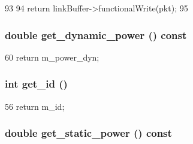 \begin{DoxyCode}
93 {
94     return linkBuffer->functionalWrite(pkt);
95 }
\end{DoxyCode}
\hypertarget{classNetworkLink__d_a10bdb0a8b5af73052370b12b1045bd10}{
\subsubsection[{get\_\-dynamic\_\-power}]{\setlength{\rightskip}{0pt plus 5cm}double get\_\-dynamic\_\-power () const}}
\label{classNetworkLink__d_a10bdb0a8b5af73052370b12b1045bd10}



\begin{DoxyCode}
60 { return m_power_dyn; }
\end{DoxyCode}
\hypertarget{classNetworkLink__d_a1f0b8f09abd10342468ce33a1da15557}{
\subsubsection[{get\_\-id}]{\setlength{\rightskip}{0pt plus 5cm}int get\_\-id ()}}
\label{classNetworkLink__d_a1f0b8f09abd10342468ce33a1da15557}



\begin{DoxyCode}
56 {return m_id;}
\end{DoxyCode}
\hypertarget{classNetworkLink__d_aeb5933543cfdeb1668baed5ce7c68351}{
\subsubsection[{get\_\-static\_\-power}]{\setlength{\rightskip}{0pt plus 5cm}double get\_\-static\_\-power () const}}
\label{classNetworkLink__d_aeb5933543cfdeb1668baed5ce7c68351}



